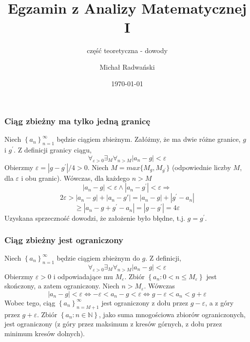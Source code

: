 \documentclass[11pt]{beamer}
\newcommand{\below}[1]{\displaystyle\mathop{#1}}
\begin{document}
	\author{Michał Radwański}
	\title{Egzamin z Analizy Matematycznej I}
	\subtitle{część teoretyczna - dowody}
	\date{\today}
	\begin{frame}[plain]
		\maketitle
	\end{frame}

\begin{frame}
\frametitle{Ciąg zbieżny ma tylko jedną granicę}
Niech $\left\{a_n\right\}_{n = 1}^{\infty}$ będzie ciągiem zbieżnym. Załóżmy, że ma dwie różne granice, $g$ i $g^\prime$. Z definicji granicy ciągu, 
\[
	\below{\forall}_{\varepsilon > 0} \below{\exists}_{M} \below{\forall}_{n > M} |a_n - g| < \varepsilon
\]
Obierzmy $\varepsilon = |g - g^\prime|/4 > 0$. Niech $M = max\{M_g, M_{g^\prime}\}$ (odpowiednie liczby $M$, dla $\varepsilon$ i obu granic). Wówczas, dla każdego $n > M$
\[
	|a_n - g| < \varepsilon  \land |a_n - g^\prime| < \varepsilon \Rightarrow
\]
\[
	2\varepsilon > |a_n - g| + |a_n - g'| = |a_n - g| + |g^\prime - a_n| 
\]
\[
	\geq |a_n - g + g^\prime - a_n| = |g - g^\prime| = 4\varepsilon
\]
Uzyskana sprzeczność dowodzi, że założenie było błędne, t.j. $g = g^\prime$.
\end{frame}
\begin{frame}
\frametitle{Ciąg zbieżny jest ograniczony}
Niech $\left\{a_n\right\}_{n = 1}^{\infty}$ będzie ciągiem zbieżnym do $g$. Z definicji,
\[
	\below{\forall}_{\varepsilon > 0} \below{\exists}_{M} \below{\forall}_{n > M} |a_n - g| < \varepsilon
\]
Obierzmy $\varepsilon > 0$ i odpowiadające mu $M_\varepsilon$. Zbiór $\left\{a_n : 0 < n \leq M_\varepsilon \right\}$ jest skończony, a zatem ograniczony.
Niech $n > M_\varepsilon$. Wówczas 
\[
	|a_n - g| < \varepsilon \Leftrightarrow -\varepsilon < a_n - g < \varepsilon \Leftrightarrow g - \varepsilon < a_n < g + \varepsilon
\]
Wobec tego, ciąg $\left\{a_n\right\}_{n = M+1}^{\infty}$ jest ograniczony z dołu przez $g - \varepsilon$, a z góry przez $g + \varepsilon$. Zbiór $\left\{a_n : n \in \mathbb{N}\right\}$, jako suma mnogościowa zbiorów ograniczonych, jest ograniczony (z góry przez maksimum z kresów górnych, z dołu przez minimum kresów dolnych).
\end{frame}
\end{document}
